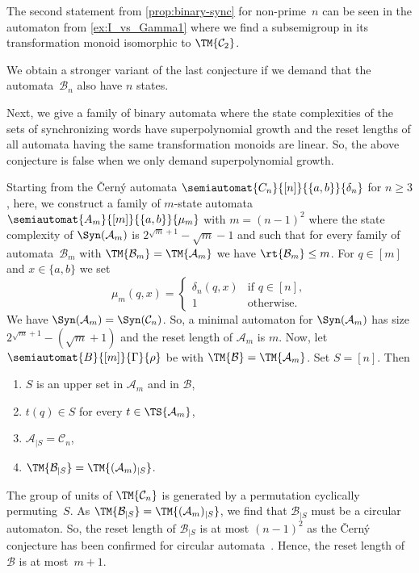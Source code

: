 The second statement from \cref{prop:binary-sync} for non-prime~$n$
can be seen in the automaton from \cref{ex:I_vs_Gamma1} where we find
a subsemigroup in its transformation monoid isomorphic to $\TM{\mathcal C_2}$.

We obtain a stronger variant of the last conjecture if we demand that the 
automata~$\mathcal B_n$ also have $n$ states.

Next, we give a family of binary automata where the state complexities
of the sets of synchronizing words have superpolynomial growth
and the reset lengths of all automata having the same transformation monoids
are linear. So, the above conjecture is false 
when we only demand superpolynomial growth.

\begin{example}\label{syncmax:slowly:ex} 
	Starting from the  \v{C}ern\'y automata  $\semiautomat{C_n}{[n]}{\{a,b\}}{\delta_n}$ for $n \ge 3$,
	here, we construct a family of $m$-state automata~$\semiautomat{A_m}{[m]}{\{a,b\}}{\mu_m}$ with $m = (n-1)^2$
	where the state complexity of $\Syn(\mathcal A_m)$
	is $2^{\sqrt{m}+1} - \sqrt{m} - 1$ and such that for every family of automata~$\mathcal B_m$
	with $\TM{\mathcal B_m} = \TM{\mathcal A_m}$
	we have $\rt{\mathcal B_m} \le m$.
	For $q \in [m]$ and $x \in \{a,b\}$ we set
	\[
	\mu_m(q, x) =
	\begin{cases}
		\delta_n(q, x) & \text{if } q \in [n], \\
		1              & \text{otherwise.}		
	\end{cases}
	\]
	We have $\Syn(\mathcal A_m) = \Syn(\mathcal C_n)$.
	So, a minimal automaton for $\Syn(\mathcal A_m)$
	has size $2^{\sqrt{m} + 1} - (\sqrt{m} + 1)$
	and the reset length of $\mathcal A_m$
	is $m$.
	Now, let $\semiautomat{B}{[m]}{\Gamma}{\rho}$
	be with $\TM{\mathcal B} = \TM{\mathcal A_m}$.
    Set $S = [n]$. Then
    \begin{enumerate}
    \item $S$ is an upper set in  $\mathcal A_m$
    and in $\mathcal B$,
    
    \item $t(q) \in S$ for every $t \in \TS{\mathcal A_m}$,
    
    \item $\mathcal A_{|S} = \mathcal C_n$,
    
    \item $\TM{\mathcal B_{|S}} = \TM{( \mathcal A_m )_{|S}}$.    
    \end{enumerate}
    The group of units of $\TM{\mathcal C_n}$
    is generated by a permutation cyclically permuting~$S$.
    As $\TM{\mathcal B_{|S}} = \TM{( \mathcal A_m )_{|S}}$,
    we find that $\mathcal B_{|S}$ must be a circular
    automaton.
    So, the reset length of $\mathcal B_{|S}$
    is at most $(n-1)^2$
    as the \v{C}ern\'y conjecture
    has been confirmed for circular automata~\cite{Dubuc98}.		
    Hence, the reset length of~$\mathcal B$
    is at most~$m + 1$.	
\end{example}